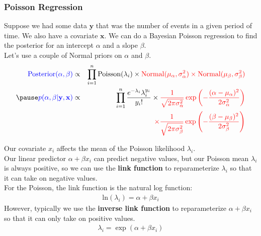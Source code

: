 \documentclass[handout]{beamer}
\begin{document}
\begin{frame}
\frametitle{Poisson Regression}
\pause
Suppose we had some data $\mathbf{y}$ that was the number of events in
a given period of time.  \pause We also have a covariate
$\mathbf{x}$. \pause We can do a Bayesian Poisson regression to find
the posterior for an intercept $\alpha$ and a slope $\beta$. \\
\bigskip
\pause
Let's use a couple of Normal priors on $\alpha$ and $\beta$. 
\footnotesize
\begin{eqnarray*}
\blue{\mathrm{Posterior}(\alpha, \beta)} &\propto& \prod_{i=1}^n
\mathrm{Poisson}(\lambda_i) \times \red{\mathrm{Normal}(\mu_{\alpha},
\sigma^2_{\alpha}) \times \mathrm{Normal}(\mu_{\beta}, \sigma^2_{\beta})} \\
\pause
\blue{p(\alpha, \beta | \mathbf{y}, \mathbf{x})} &\propto&
\prod_{i=1}^n \frac{e^{-\lambda_i} \lambda_i^{y_i}}{y_i !} \times
\red{\frac{1}{\sqrt{2\pi \sigma^2_{\alpha}}} \exp \left(-
\frac{(\alpha - \mu_{\alpha})^2}{2 \sigma_{\alpha}^2}\right)}\\
&\phantom{\propto}& \red{\times \frac{1}{\sqrt{2\pi \sigma^2_{\beta}}} \exp \left(-\frac{(\beta - \mu_{\beta})^2}{2 \sigma_{\beta}^2}\right)} 
\end{eqnarray*}
\end{frame}

\begin{frame}
Our covariate $x_i$ affects the mean of the Poisson likelihood
$\lambda_i$.  \\
\bigskip
\pause
Our linear predictor $\alpha + \beta x_i$ can predict negative values,
but our Poisson mean $\lambda_i$ is always positive, so we can use the
\textbf{link function} to reparameterize $\lambda_i$ so that it can take on
negative values.\\

\bigskip
\pause
For the Poisson, the link function is the natural log function:
\begin{eqnarray*}
\mathrm{ln} (\lambda_i) = \alpha + \beta x_i
\end{eqnarray*}
\pause
However, typically we use the \textbf{inverse link function} to
reparameterize $\alpha + \beta x_i$ so that it can only take on
positive values.
\pause
\begin{eqnarray*}
\lambda_i = \exp (\alpha + \beta x_i)
\end{eqnarray*}
\end{frame}
\end{document}
